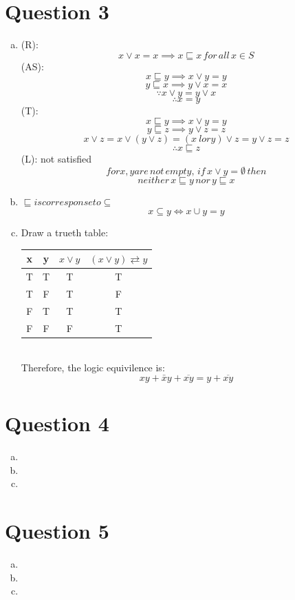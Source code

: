 \documentclass[11pt, a4paper]{article}
\begin{document}
\section*{Question 3}
\begin{enumerate}[(a)]
    \item
    (R):
    $$ x \lor x = x \implies x \sqsubseteq x \,  for\, all\, x \in S $$
    (AS):
    $$ x \sqsubseteq y \implies x \lor y = y $$
    $$ y \sqsubseteq x \implies y \lor x = x $$
    $$ \because x \lor y =y \lor x$$
    $$ \therefore x =y $$
    (T):
    $$ x \sqsubseteq y \implies x \lor y = y $$
    $$ y \sqsubseteq z \implies y \lor z = z $$
    $$ x \lor z = x \lor (y \lor z) = (x \ lor y) \lor z = y \lor z = z $$
    $$ \therefore x \sqsubseteq z $$
    (L): not satisfied
    $$ for x, y are\, not\, empty,\, if\, x \lor y = \emptyset\, then$$
    $$ neither\,x \sqsubseteq y\, nor\, y \sqsubseteq x $$
    \item
    $\sqsubseteq is corresponse to \subseteq $
    $$ x \subseteq y \iff x \cup y = y $$
    \item
    Draw a trueth table:\\
    \begin{tabular}{ | c | c | c | c |}
        \hline
        x & y & $x \lor y$ & $ (x \lor y ) \rightleftarrows y$\\
        \hline
        T & T & T & T\\
        \hline
        T & F & T & F\\
        \hline
        F & T & T & T\\
        \hline
        F & F & F & T\\
        \hline
        \end{tabular}\\
        Therefore, the logic equivilence is:
        $$ xy + \bar{x}y + \overline{xy} = y + \overline{xy}$$
\end{enumerate}

\section*{Question 4}
\begin{enumerate}[(a)]
    \item


    \item


    \item
\end{enumerate}

\section*{Question 5}
\begin{enumerate}[(a)]
    \item


    \item


    \item
\end{enumerate}
\end{document}
